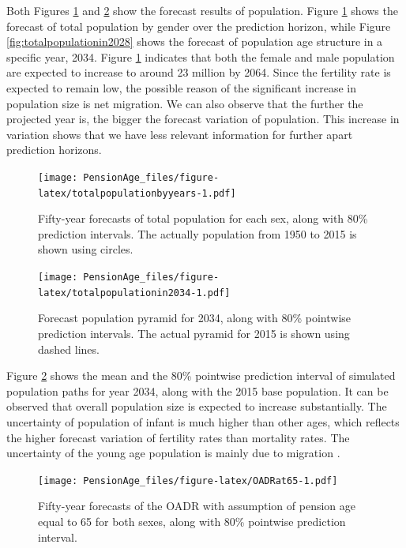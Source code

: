 \documentclass[11pt,a4paper,]{article}
\begin{document}
Both Figures \ref{fig:totalpopulationbyyears} and
\ref{fig:totalpopulationin2034} show the forecast results of population.
Figure \ref{fig:totalpopulationbyyears} shows the forecast of total
population by gender over the prediction horizon, while Figure
\ref{fig:totalpopulationin2028} shows the forecast of population age
structure in a specific year, 2034. Figure
\ref{fig:totalpopulationbyyears} indicates that both the female and male
population are expected to increase to around 23 million by 2064. Since
the fertility rate is expected to remain low, the possible reason of the
significant increase in population size is net migration. We can also
observe that the further the projected year is, the bigger the forecast
variation of population. This increase in variation shows that we have
less relevant information for further apart prediction horizons.

\begin{figure}
\centering
\texttt{[image: PensionAge\_files/figure-latex/totalpopulationbyyears-1.pdf]}
\caption{\label{fig:totalpopulationbyyears}Fifty-year forecasts of total
population for each sex, along with 80\% prediction intervals. The
actually population from 1950 to 2015 is shown using circles.}
\end{figure}

\begin{figure}
\centering
\texttt{[image: PensionAge\_files/figure-latex/totalpopulationin2034-1.pdf]}
\caption{\label{fig:totalpopulationin2034}Forecast population pyramid for
2034, along with 80\% pointwise prediction intervals. The actual pyramid
for 2015 is shown using dashed lines.}
\end{figure}

Figure \ref{fig:totalpopulationin2034} shows the mean and the 80\%
pointwise prediction interval of simulated population paths for year
2034, along with the 2015 base population. It can be observed that
overall population size is expected to increase substantially. The
uncertainty of population of infant is much higher than other ages,
which reflects the higher forecast variation of fertility rates than
mortality rates. The uncertainty of the young age population is mainly
due to migration \autocite{HB08}.

\begin{figure}
\centering
\texttt{[image: PensionAge\_files/figure-latex/OADRat65-1.pdf]}
\caption{\label{fig:OADRat65}Fifty-year forecasts of the OADR with
assumption of pension age equal to 65 for both sexes, along with 80\%
pointwise prediction interval.}
\end{figure}
\end{document}
